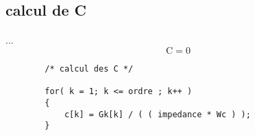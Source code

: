 \documentclass[a4paper,11pt]{article}
\begin{document}
\subsection{calcul de C }
    \paragraph{}
    ... \[ \mbox{C} = 0 \]
    \begin{lstlisting}
        /* calcul des C */

        for( k = 1; k <= ordre ; k++ )
        {
            c[k] = Gk[k] / ( ( impedance * Wc ) );
        }

    \end{lstlisting}
\end{document}
